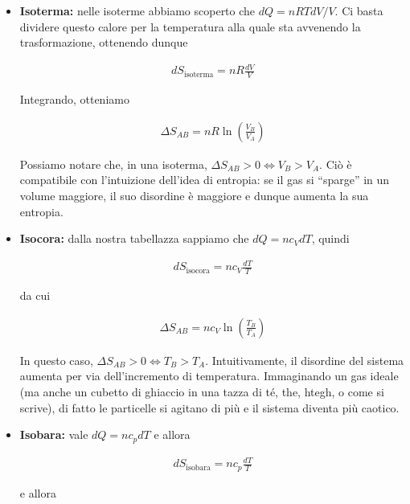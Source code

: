 \begin{itemize}
    \item \textbf{Isoterma:} nelle isoterme abbiamo scoperto che
    $dQ = nRTdV/V$. Ci basta dividere questo calore per la temperatura
    alla quale sta avvenendo la trasformazione, ottenendo dunque
    
    \begin{align}
        dS_\text{isoterma} = nR\frac{dV}{V}
    \end{align}

    \noindent Integrando, otteniamo

    \begin{align}
        \Delta S_{AB} = nR\ln\left(\frac{V_B}{V_A}\right)
    \end{align}

    \noindent Possiamo notare che, in una isoterma, $\Delta S_{AB} > 0 \Leftrightarrow V_B > V_A$.
    Ciò è compatibile con l'intuizione dell'idea di entropia: se il gas
    si ``sparge'' in un volume maggiore, il suo disordine è maggiore e
    dunque aumenta la sua entropia.

    \item \textbf{Isocora:} dalla nostra tabellazza sappiamo che $dQ = nc_VdT$,
    quindi

    \begin{align}
        dS_\text{isocora} = nc_V\frac{dT}{T}
    \end{align}

    \noindent da cui

    \begin{align}
        \Delta S_{AB} = nc_V\ln\left(\frac{T_B}{T_A}\right)
    \end{align}

    \noindent In questo caso, $\Delta S_{AB} > 0 \Longleftrightarrow T_B > T_A$.
    Intuitivamente, il disordine del sistema aumenta per via dell'incremento
    di temperatura. Immaginando un gas ideale (ma anche un cubetto di ghiaccio
    in una tazza di té, the, htegh, o come si scrive), di fatto le particelle
    si agitano di più e il sistema diventa più caotico.

    \item \textbf{Isobara:} vale $dQ = nc_pdT$ e allora
    
    \begin{align}
        dS_\text{isobara} = nc_p\frac{dT}{T}
    \end{align}

    \noindent e allora


\end{itemize}
